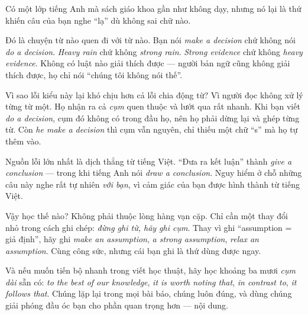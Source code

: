 \documentclass[../../english.tex]{subfiles}
\begin{document}
\begin{dongian}
Có một lớp tiếng Anh mà sách giáo khoa gần như không dạy, nhưng nó lại là thứ khiến câu của bạn nghe ``lạ'' dù không sai chữ nào.

Đó là chuyện từ nào quen đi với từ nào. Bạn nói \emph{make a decision} chứ không nói \emph{do a decision}. \emph{Heavy rain} chứ không \emph{strong rain}. \emph{Strong evidence} chứ không \emph{heavy evidence}. Không có luật nào giải thích được --- người bản ngữ cũng không giải thích được, họ chỉ nói ``chúng tôi không nói thế''.

Vì sao lỗi kiểu này lại khó chịu hơn cả lỗi chia động từ? Vì người đọc không xử lý từng từ một. Họ nhận ra cả \emph{cụm} quen thuộc và lướt qua rất nhanh. Khi bạn viết \emph{do a decision}, cụm đó không có trong đầu họ, nên họ phải dừng lại và ghép từng từ. Còn \emph{he make a decision} thì cụm vẫn nguyên, chỉ thiếu một chữ ``s'' mà họ tự thêm vào.

Nguồn lỗi lớn nhất là dịch thẳng từ tiếng Việt. ``Đưa ra kết luận'' thành \emph{give a conclusion} --- trong khi tiếng Anh nói \emph{draw a conclusion}. Nguy hiểm ở chỗ những câu này nghe rất tự nhiên \emph{với bạn}, vì cảm giác của bạn được hình thành từ tiếng Việt.

Vậy học thế nào? Không phải thuộc lòng hàng vạn cặp. Chỉ cần một thay đổi nhỏ trong cách ghi chép: \emph{đừng ghi từ, hãy ghi cụm}. Thay vì ghi ``assumption = giả định'', hãy ghi \emph{make an assumption}, \emph{a strong assumption}, \emph{relax an assumption}. Cùng công sức, nhưng cái bạn ghi là thứ dùng được ngay.

Và nếu muốn tiến bộ nhanh trong viết học thuật, hãy học khoảng ba mươi \emph{cụm dài} sẵn có: \emph{to the best of our knowledge}, \emph{it is worth noting that}, \emph{in contrast to}, \emph{it follows that}. Chúng lặp lại trong mọi bài báo, chúng luôn đúng, và dùng chúng giải phóng đầu óc bạn cho phần quan trọng hơn --- nội dung.
\end{dongian}
\end{document}
